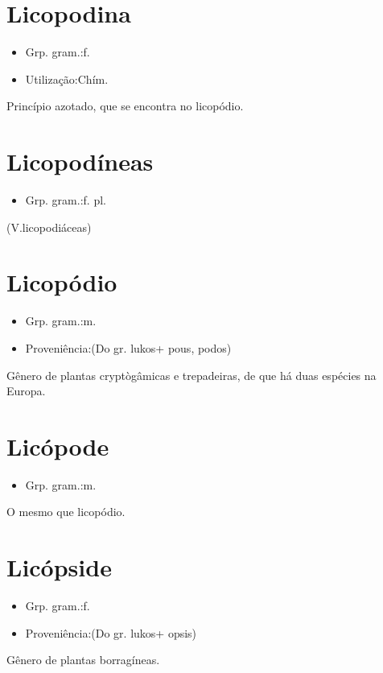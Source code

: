 \section{Licopodina}
\begin{itemize}
\item {Grp. gram.:f.}
\end{itemize}
\begin{itemize}
\item {Utilização:Chím.}
\end{itemize}
Princípio azotado, que se encontra no licopódio.
\section{Licopodíneas}
\begin{itemize}
\item {Grp. gram.:f. pl.}
\end{itemize}
(V.licopodiáceas)
\section{Licopódio}
\begin{itemize}
\item {Grp. gram.:m.}
\end{itemize}
\begin{itemize}
\item {Proveniência:(Do gr. \textunderscore lukos\textunderscore  + \textunderscore pous\textunderscore , \textunderscore podos\textunderscore )}
\end{itemize}
Gênero de plantas cryptògâmicas e trepadeiras, de que há duas espécies na Europa.
\section{Licópode}
\begin{itemize}
\item {Grp. gram.:m.}
\end{itemize}
O mesmo que \textunderscore licopódio\textunderscore .
\section{Licópside}
\begin{itemize}
\item {Grp. gram.:f.}
\end{itemize}
\begin{itemize}
\item {Proveniência:(Do gr. \textunderscore lukos\textunderscore  + \textunderscore opsis\textunderscore )}
\end{itemize}
Gênero de plantas borragíneas.
